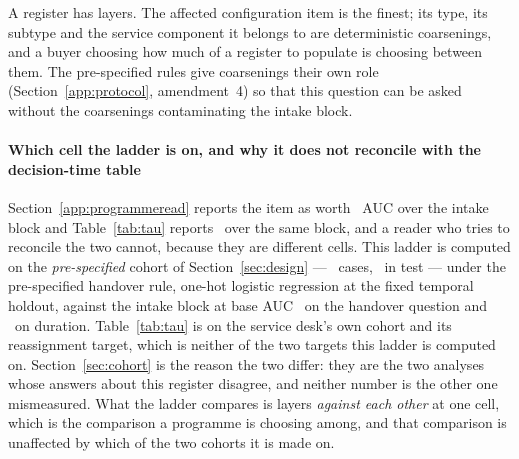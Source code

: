 A register has layers. The affected configuration item is the finest; its
type, its subtype and the service component it belongs to are deterministic
coarsenings, and a buyer choosing how much of a register to populate is
choosing between them. The pre-specified rules give coarsenings their own role
(Section~\ref{app:protocol}, amendment~4) so that this question can be asked
without the coarsenings contaminating the intake block.



\paragraph{Which cell the ladder is on, and why it does not reconcile with the
decision-time table}
Section~\ref{app:programmeread} reports the item as worth \layerItemHandover\ AUC
over the intake block and Table~\ref{tab:tau} reports \VtauTwo\ over the same
block, and a reader who tries to reconcile the two cannot, because they are
different cells. This ladder is computed on the \emph{pre-specified} cohort of
Section~\ref{sec:design} --- \layerLadderN\ cases, \layerLadderNTest\ in
test --- under the pre-specified handover rule, one-hot logistic regression at the
fixed temporal holdout, against the intake block at base AUC
\layerBaseHandover\ on the handover question and \layerBaseDuration\ on
duration. Table~\ref{tab:tau} is on the service desk's own cohort and its
reassignment target, which is neither of the two targets this ladder is
computed on. Section~\ref{sec:cohort} is the reason the two differ:
they are the two analyses whose answers about this register disagree, and
neither number is the other one mismeasured. What the ladder compares is
layers \emph{against each other} at one cell, which is the comparison a
programme is choosing among, and that comparison is unaffected by which of the
two cohorts it is made on.

